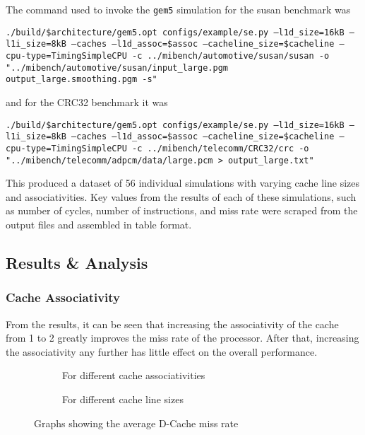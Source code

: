 The command used to invoke the \texttt{gem5} simulation for the susan benchmark was

\texttt{./build/\${architecture}/gem5.opt configs/example/se.py --l1d\_size=16kB --l1i\_size=8kB --caches --l1d\_assoc=\${assoc} --cacheline\_size=\${cacheline} --cpu-type=TimingSimpleCPU -c ../mibench/automotive/susan/susan -o "../mibench/automotive/susan/input\_large.pgm output\_large.smoothing.pgm -s"}

and for the CRC32 benchmark it was

\texttt{./build/\${architecture}/gem5.opt configs/example/se.py --l1d\_size=16kB --l1i\_size=8kB --caches --l1d\_assoc=\${assoc} --cacheline\_size=\${cacheline} --cpu-type=TimingSimpleCPU -c ../mibench/telecomm/CRC32/crc -o "../mibench/telecomm/adpcm/data/large.pcm > output\_large.txt"}

This produced a dataset of 56 individual simulations with varying cache line sizes and 
associativities.
Key values from the results of each of these simulations, such as number of cycles, 
number of instructions, and miss rate were scraped from the output files and assembled 
in table format.

\subsection{Results \& Analysis}

\subsubsection{Cache Associativity}

From the results, it can be seen that increasing the associativity of the cache from 
1 to 2 greatly improves the miss rate of the processor. After that, increasing the 
associativity any further has little effect on the overall performance.


\begin{figure}[H]%
\begin{subfigure}{.5\textwidth}
    \centering
    
    \caption{For different cache associativities}
    \label{fig:partb-assoc}
\end{subfigure}%
\hfill%
\begin{subfigure}{.5\textwidth}
    \centering
    
    \caption{For different cache line sizes}
    \label{fig:partb-cacheln}
\end{subfigure}%
\caption{Graphs showing the average D-Cache miss rate}
\label{fig:partb-avgs}
\end{figure}

